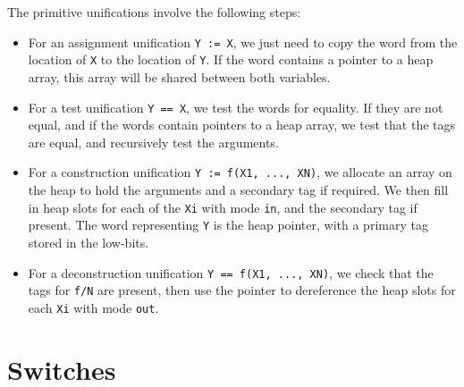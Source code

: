 The primitive unifications involve the following steps:
\begin{itemize}
\item
For an assignment unification \texttt{Y := X},
we just need to copy the word from
the location of \texttt{X} to the location of \texttt{Y}.
If the word contains a pointer to a heap array,
this array will be shared between both variables.
\item
For a test unification \texttt{Y == X},
we test the words for equality.
If they are not equal,
and if the words contain pointers to a heap array,
we test that the tags are equal,
and recursively test the arguments.
\item
For a construction unification \texttt{Y := f(X1, ..., XN)},
we allocate an array on the heap to hold the arguments
and a secondary tag if required.
We then fill in heap slots
for each of the \texttt{Xi} with mode \texttt{in},
and the secondary tag if present.
The word representing \texttt{Y} is the heap pointer,
with a primary tag stored in the low-bits.
\item
For a deconstruction unification \texttt{Y == f(X1, ..., XN)},
we check that the tags for \texttt{f/N} are present,
then use the pointer to dereference the heap slots
for each \texttt{Xi} with mode \texttt{out}.
\end{itemize}


\section{Switches}
\label{sec:switches}


